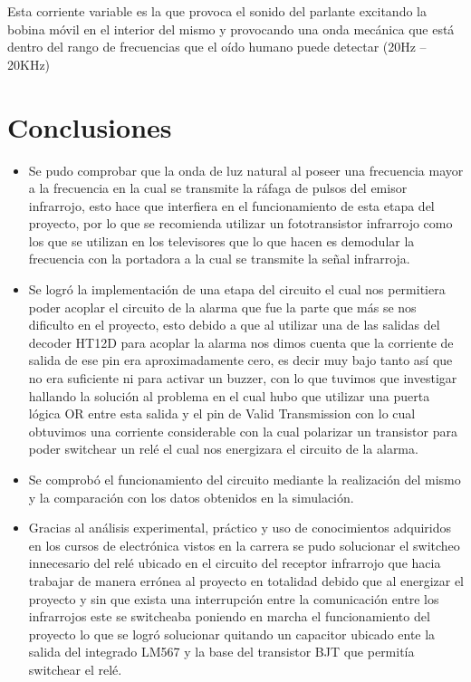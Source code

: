 \documentclass[a4paper,11pt]{article}
\begin{document}
Esta corriente variable es la que provoca el sonido del parlante excitando la bobina móvil en el interior del mismo y provocando una onda mecánica que está dentro del rango de frecuencias que el oído humano puede detectar (20Hz – 20KHz)

\newpage
\section{Conclusiones}
\begin{itemize}
	\item Se pudo comprobar que la onda de luz natural al poseer una frecuencia mayor a la frecuencia en la cual se transmite la ráfaga de pulsos del emisor infrarrojo, esto hace que interfiera en el funcionamiento de esta etapa del proyecto, por lo que se recomienda utilizar un fototransistor infrarrojo como los que se utilizan en los televisores que lo que hacen es demodular la frecuencia con la portadora a la cual se transmite la señal infrarroja.
	\item Se logró la implementación de una etapa del circuito el cual nos permitiera poder acoplar el circuito de la alarma que fue la parte que más se nos dificulto en el proyecto, esto debido a que al utilizar una de las salidas del decoder HT12D para acoplar la alarma nos dimos cuenta que la corriente de salida de ese pin era aproximadamente cero, es decir muy bajo tanto así que no era suficiente ni para activar un buzzer, con lo que tuvimos que investigar hallando la solución al problema en el cual hubo que utilizar una puerta lógica OR entre esta salida y el pin de Valid Transmission con lo cual obtuvimos una corriente considerable con la cual polarizar un transistor para poder switchear un relé el cual nos energizara el circuito de la alarma.
	\item Se comprobó el funcionamiento del circuito mediante la realización del mismo y la comparación con los datos obtenidos en la simulación.
	\item Gracias al análisis experimental, práctico y uso de conocimientos adquiridos en los cursos de electrónica vistos en la carrera se pudo solucionar el switcheo innecesario del relé ubicado en el circuito del receptor infrarrojo que hacia trabajar de manera errónea al proyecto en totalidad debido que al energizar el proyecto y sin que exista una interrupción entre la comunicación entre los infrarrojos este se switcheaba poniendo en marcha el funcionamiento del proyecto lo que se logró solucionar quitando un capacitor ubicado ente la salida del integrado LM567 y la base del transistor BJT que permitía switchear el relé.
\end{itemize}
\end{document}
